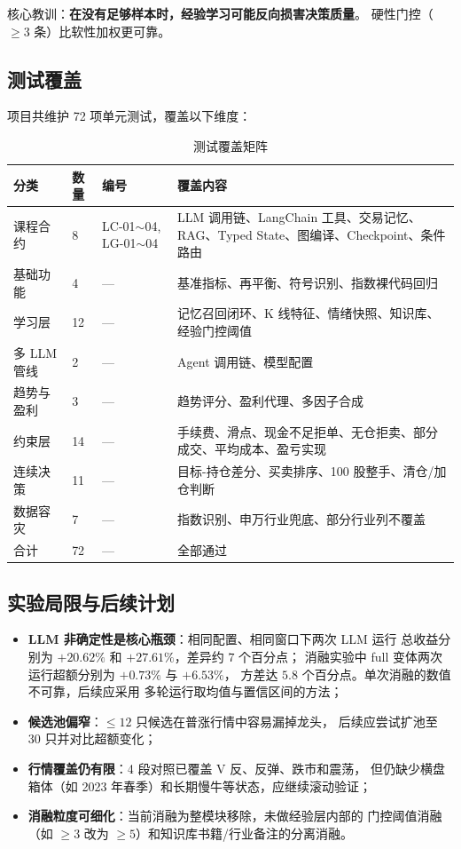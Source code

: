 \documentclass[a4paper,11pt]{article}
\begin{document}
核心教训：\textbf{在没有足够样本时，经验学习可能反向损害决策质量}。
硬性门控（$\geq 3$ 条）比软性加权更可靠。

\subsection{测试覆盖}

项目共维护 72 项单元测试，覆盖以下维度：

\begin{table}[H]
\centering
\caption{测试覆盖矩阵}
\begin{tabularx}{0.96\linewidth}{l l l X}
\toprule
分类 & 数量 & 编号 & 覆盖内容 \\
\midrule
课程合约 & 8 & LC-01$\sim$04, LG-01$\sim$04 & LLM 调用链、LangChain 工具、交易记忆、RAG、Typed State、图编译、Checkpoint、条件路由 \\
基础功能 & 4 & — & 基准指标、再平衡、符号识别、指数裸代码回归 \\
学习层 & 12 & — & 记忆召回闭环、K 线特征、情绪快照、知识库、经验门控阈值 \\
多 LLM 管线 & 2 & — & Agent 调用链、模型配置 \\
趋势与盈利 & 3 & — & 趋势评分、盈利代理、多因子合成 \\
约束层 & 14 & — & 手续费、滑点、现金不足拒单、无仓拒卖、部分成交、平均成本、盈亏实现 \\
连续决策 & 11 & — & 目标-持仓差分、买卖排序、100 股整手、清仓/加仓判断 \\
数据容灾 & 7 & — & 指数识别、申万行业兜底、部分行业列不覆盖 \\
\midrule
合计 & 72 & — & 全部通过 \\
\bottomrule
\end{tabularx}
\label{tab:tests}
\end{table}

\subsection{实验局限与后续计划}

\begin{itemize}
    \item \textbf{LLM 非确定性是核心瓶颈}：相同配置、相同窗口下两次 LLM 运行
    总收益分别为 $+20.62\%$ 和 $+27.61\%$，差异约 $7$ 个百分点；
    消融实验中 full 变体两次运行超额分别为 $+0.73\%$ 与 $+6.53\%$，
    方差达 $5.8$ 个百分点。单次消融的数值不可靠，后续应采用
    多轮运行取均值与置信区间的方法；
    \item \textbf{候选池偏窄}：$\leq 12$ 只候选在普涨行情中容易漏掉龙头，
    后续应尝试扩池至 30 只并对比超额变化；
    \item \textbf{行情覆盖仍有限}：4 段对照已覆盖 V 反、反弹、跌市和震荡，
    但仍缺少横盘箱体（如 2023 年春季）和长期慢牛等状态，应继续滚动验证；
    \item \textbf{消融粒度可细化}：当前消融为整模块移除，未做经验层内部的
    门控阈值消融（如 $\geq 3$ 改为 $\geq 5$）和知识库书籍/行业备注的分离消融。
\end{itemize}
\end{document}
